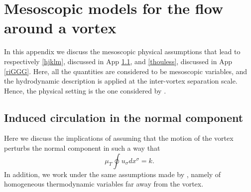 \documentclass[preprints,article,accept,moreauthors,pdftex]{mdpi}
\begin{document}
\section{Mesoscopic models for the flow around a vortex}

In this appendix we discuss the mesoscopic physical assumptions that lead to respectively \eqref{hjklm}, discussed in App \ref{vbaf}, and \eqref{thouless}, discussed in App \ref{riGGG}. Here, all the quantities are considered to be mesoscopic variables, and the hydrodynamic description is applied at the inter-vortex separation scale. 
Hence, the physical setting is the one considered by \citet{Carter_Prix_Magnus}.

\subsection{Induced circulation in the normal component}\label{vbaf}

Here we discuss the implications of assuming that the motion of the vortex perturbs the normal component in such a way that
\begin{equation}\label{baruffantone}
\mu_T \oint u_\sigma dx^\sigma = k.
\end{equation}
In addition, we work under the same assumptions made by \citet{sourie2020IJMPB}, namely of homogeneous thermodynamic variables far away from the vortex.
\end{document}
